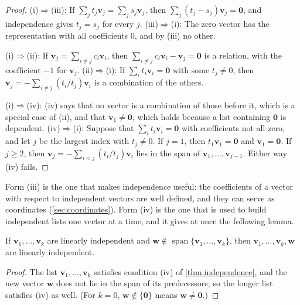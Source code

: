 \begin{proof}
(i)$\Rightarrow$(iii): If $\sum_jt_j\mathbf v_j=\sum_js_j\mathbf v_j$, then $\sum_j(t_j-s_j)\mathbf v_j=\mathbf 0$, and independence gives $t_j=s_j$ for every $j$. (iii)$\Rightarrow$(i): The zero vector has the representation with all coefficients $0$, and by (iii) no other.

(i)$\Rightarrow$(ii): If $\mathbf v_j=\sum_{i\ne j}c_i\mathbf v_i$, then $\sum_{i\ne j}c_i\mathbf v_i-\mathbf v_j=\mathbf 0$ is a relation, with the coefficient $-1$ for $\mathbf v_j$. (ii)$\Rightarrow$(i): If $\sum_it_i\mathbf v_i=\mathbf 0$ with some $t_j\ne0$, then $\mathbf v_j=-\sum_{i\ne j}(t_i/t_j)\mathbf v_i$ is a combination of the others.

(i)$\Rightarrow$(iv): (iv) says that no vector is a combination of those before it, which is a special case of (ii), and that $\mathbf v_1\ne\mathbf 0$, which holds because a list containing $\mathbf 0$ is dependent. (iv)$\Rightarrow$(i): Suppose that $\sum_it_i\mathbf v_i=\mathbf 0$ with coefficients not all zero, and let $j$ be the largest index with $t_j\ne0$. If $j=1$, then $t_1\mathbf v_1=\mathbf 0$ and $\mathbf v_1=\mathbf 0$. If $j\ge2$, then $\mathbf v_j=-\sum_{i<j}(t_i/t_j)\mathbf v_i$ lies in the span of $\mathbf v_1,\ldots,\mathbf v_{j-1}$. Either way (iv) fails.
\end{proof}

Form (iii) is the one that makes independence useful: the coefficients of a vector with respect to independent vectors are well defined, and they can serve as coordinates (\cref{sec:coordinates}). Form (iv) is the one that is used to build independent lists one vector at a time, and it gives at once the following lemma.

\begin{lemma}
\label{lem:extend-independent}
If $\mathbf v_1,\ldots,\mathbf v_k$ are linearly independent and $\mathbf w\notin\operatorname{span}\{\mathbf v_1,\ldots,\mathbf v_k\}$, then $\mathbf v_1,\ldots,\mathbf v_k,\mathbf w$ are linearly independent.
\end{lemma}

\begin{proof}
The list $\mathbf v_1,\ldots,\mathbf v_k$ satisfies condition (iv) of \cref{thm:independence}, and the new vector $\mathbf w$ does not lie in the span of its predecessors; so the longer list satisfies (iv) as well. (For $k=0$, $\mathbf w\notin\{\mathbf 0\}$ means $\mathbf w\ne\mathbf 0$.)
\end{proof}

